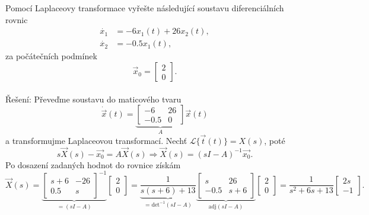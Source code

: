 \documentclass[twoside]{article}
\begin{document}
\subsection{~}
Pomocí Laplaceovy transformace vyřešte následující soustavu diferenciálních rovnic
\begin{equation*}
	\begin{split}
		\dot{x_1} &= - 6x_1 (t) + 26x_2 (t), \\
		\dot{x_2} &= - 0.5 x_1(t),
	\end{split}
\end{equation*}
za počátečních podmínek
\begin{equation*}
	\vec{x}_0 = \begin{bmatrix}
		2 \\
		0
	  \end{bmatrix}.
\end{equation*} \\
Řešení: Převeďme soustavu do maticového tvaru
\begin{equation*}
	\dot{\vec{x}}(t) = \underbrace{\begin{bmatrix}
		-6 & 26 \\
		-0.5 & 0
	\end{bmatrix}}_{A} \vec{x}(t)
\end{equation*}
a transformujme Laplaceovou transformací. Nechť $\mathcal{L}\{\vec{t}(t)\} = X(s)$, poté
\begin{equation*}
	s\vec{X}(s) - \vec{x_0} = A\vec{X}(s) \Rightarrow \vec{X}(s) = (sI-A)^{-1}\vec{x_0}.
\end{equation*}
Po dosazení zadaných hodnot do rovnice získám
\begin{equation*}
	\vec{X}(s) = \underbrace{\begin{bmatrix}
		s + 6 & -26 \\
		0.5 & s
	\end{bmatrix}^{-1}}_{=(sI - A)} \begin{bmatrix}
		2 \\
		0
	\end{bmatrix} = \underbrace{\frac{1}{s(s+6) + 13}}_{=\text{det}^{-1}(sI - A)} \underbrace{\begin{bmatrix}
		s & 26 \\
		-0.5 & s + 6
	\end{bmatrix}}_{\text{adj}(sI - A)} \begin{bmatrix}
		2 \\
		0
	\end{bmatrix} = \frac{1}{s^2 + 6s + 13} \begin{bmatrix}
		2s \\
		-1
	\end{bmatrix}.
\end{equation*}
\end{document}
